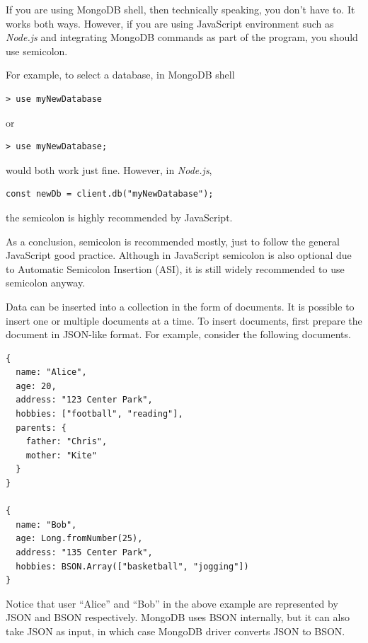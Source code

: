\begin{shortbox}

If you are using MongoDB shell, then technically speaking, you don't have to. It works both ways. However, if you are using JavaScript environment such as \textit{Node.js} and integrating MongoDB commands as part of the program, you should use semicolon.

For example, to select a database, in MongoDB shell
\begin{lstlisting}
> use myNewDatabase
\end{lstlisting}
or
\begin{lstlisting}
> use myNewDatabase;
\end{lstlisting}
would both work just fine. However, in \textit{Node.js},
\begin{lstlisting}
const newDb = client.db("myNewDatabase");
\end{lstlisting}
the semicolon is highly recommended by JavaScript.

As a conclusion, semicolon is recommended mostly, just to follow the general JavaScript good practice. Although in JavaScript semicolon is also optional due to Automatic Semicolon Insertion (ASI), it is still widely recommended to use semicolon anyway.
\end{shortbox}

Data can be inserted into a collection in the form of documents. It is possible to insert one or multiple documents at a time. To insert documents, first prepare the document in JSON-like format. For example, consider the following documents.
\begin{lstlisting}
{
  name: "Alice",
  age: 20,
  address: "123 Center Park",
  hobbies: ["football", "reading"],
  parents: {
    father: "Chris",
    mother: "Kite"
  }
}

{
  name: "Bob",
  age: Long.fromNumber(25),
  address: "135 Center Park",
  hobbies: BSON.Array(["basketball", "jogging"])
}
\end{lstlisting}
Notice that user ``Alice'' and ``Bob'' in the above example are represented by JSON and BSON respectively. MongoDB uses BSON internally, but it can also take JSON as input, in which case MongoDB driver converts JSON to BSON.


